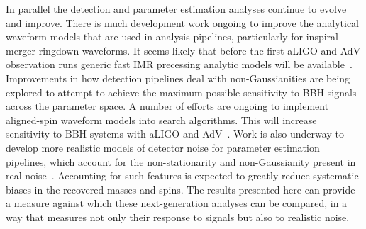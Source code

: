In parallel the detection and parameter estimation analyses continue to 
evolve and improve. There is much development work ongoing to improve the 
analytical waveform models that are used in analysis pipelines, particularly 
for inspiral-merger-ringdown waveforms. It seems likely that before the 
first aLIGO and AdV observation runs generic fast IMR precessing analytic 
models will be 
available~\cite{Santamaria:2010yb,Taracchini:2012ig,Pan:2013rra,Hannam:2013oca,
Taracchini:2013rva}.
Improvements in how detection pipelines deal with non-Gaussianities are being 
explored to attempt to achieve the maximum possible sensitivity to BBH signals 
across the parameter space. A number of efforts are ongoing to implement 
aligned-spin waveform models into  search algorithms. 
This will increase sensitivity to BBH systems with aLIGO and 
AdV~\cite{Brown:2012qf,Ajith:2012mn,Harry:2013tca}.
Work is also underway to develop more realistic models 
of detector noise for parameter estimation pipelines, which account for the 
non-stationarity and non-Gaussianity present in real 
noise~\cite{Littenberg:2013gja}.  Accounting for such features
is expected to greatly reduce systematic biases in the recovered masses and 
spins.%
The results presented here can provide a measure against which these
next-generation analyses can be compared, in a way that measures not only their
response to signals but also to realistic noise.

